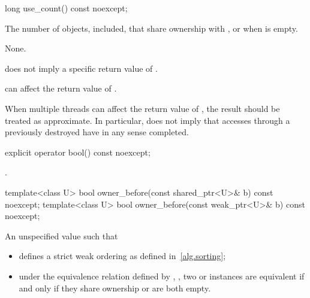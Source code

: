 %
\begin{itemdecl}
long use_count() const noexcept;
\end{itemdecl}

\begin{itemdescr}
\pnum\returns  The number of  objects,  included,
that share ownership with , or  when  is
empty.

\pnum\sync None.

\pnum \begin{note} 
does not imply a specific return value of . \end{note}

\pnum \begin{note} 
can affect the return value of . \end{note}

\pnum \begin{note} When multiple threads
can affect the return value of ,
the result should be treated as approximate.
In particular,  does not imply that accesses through
a previously destroyed  have in any sense completed. \end{note}
\end{itemdescr}

%
\begin{itemdecl}
explicit operator bool() const noexcept;
\end{itemdecl}

\begin{itemdescr}
\pnum\returns {}.
\end{itemdescr}

%
\begin{itemdecl}
template<class U> bool owner_before(const shared_ptr<U>& b) const noexcept;
template<class U> bool owner_before(const weak_ptr<U>& b) const noexcept;
\end{itemdecl}

\begin{itemdescr}
\pnum
\returns An unspecified value such that

\begin{itemize}
\item {} defines a strict weak ordering as defined in~\ref{alg.sorting};

\item under the equivalence relation defined by ,
, two  or
 instances are equivalent if and only if they share ownership or
are both empty.
\end{itemize}

\end{itemdescr}

